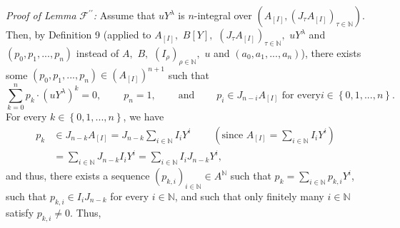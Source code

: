 \documentclass[12pt,final,notitlepage,onecolumn]{article}%
\begin{document}
\textit{Proof of Lemma }$\mathcal{F}^{\prime\prime}$\textit{:} Assume that
$uY^{\lambda}$ is $n$-integral over $\left(  A_{\left[  I\right]  },\left(
J_{\tau}A_{\left[  I\right]  }\right)  _{\tau\in\mathbb{N}}\right)  $. Then,
by Definition 9 (applied to $A_{\left[  I\right]  },$ $B\left[  Y\right]  ,$
$\left(  J_{\tau}A_{\left[  I\right]  }\right)  _{\tau\in\mathbb{N}},$
$uY^{\lambda}$ and $\left(  p_{0},p_{1},...,p_{n}\right)  $ instead of $A,$
$B,$ $\left(  I_{\rho}\right)  _{\rho\in\mathbb{N}},$ $u$ and $\left(
a_{0},a_{1},...,a_{n}\right)  $), there exists some $\left(  p_{0}%
,p_{1},...,p_{n}\right)  \in\left(  A_{\left[  I\right]  }\right)  ^{n+1}$
such that%
\[
\sum\limits_{k=0}^{n}p_{k}\cdot\left(  uY^{\lambda}\right)  ^{k}%
=0,\ \ \ \ \ \ \ \ \ \ p_{n}=1,\ \ \ \ \ \ \ \ \ \ \text{and}%
\ \ \ \ \ \ \ \ \ \ p_{i}\in J_{n-i}A_{\left[  I\right]  }\text{ for every
}i\in\left\{  0,1,...,n\right\}  .
\]
For every $k\in\left\{  0,1,...,n\right\}  $, we have%
\begin{align*}
p_{k}  &  \in J_{n-k}A_{\left[  I\right]  }=J_{n-k}\sum\limits_{i\in
\mathbb{N}}I_{i}Y^{i}\ \ \ \ \ \ \ \ \ \ \left(  \text{since }A_{\left[
I\right]  }=\sum\limits_{i\in\mathbb{N}}I_{i}Y^{i}\right) \\
&  =\sum\limits_{i\in\mathbb{N}}J_{n-k}I_{i}Y^{i}=\sum\limits_{i\in\mathbb{N}%
}I_{i}J_{n-k}Y^{i},
\end{align*}
and thus, there exists a sequence $\left(  p_{k,i}\right)  _{i\in\mathbb{N}%
}\in A^{\mathbb{N}}$ such that $p_{k}=\sum\limits_{i\in\mathbb{N}}p_{k,i}%
Y^{i}$, such that $p_{k,i}\in I_{i}J_{n-k}$ for every $i\in\mathbb{N}$, and
such that only finitely many $i\in\mathbb{N}$ satisfy $p_{k,i}\neq0$. Thus,%
\end{document}
